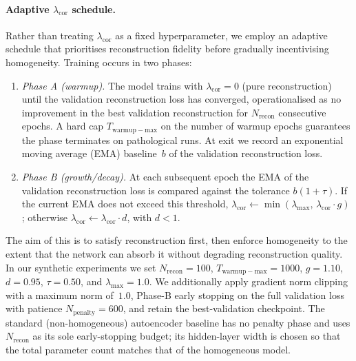 \paragraph{Adaptive $\lambda_{\mathrm{cor}}$ schedule.}
Rather than treating $\lambda_{\mathrm{cor}}$ as a fixed hyperparameter, we employ an adaptive schedule that prioritises reconstruction fidelity before gradually incentivising homogeneity.  Training occurs in two phases:
\begin{enumerate}
    \item \emph{Phase A (warmup).} The model trains with $\lambda_{\mathrm{cor}} = 0$ (pure reconstruction) until the validation reconstruction loss has converged, operationalised as no improvement in the best validation reconstruction for $N_{\mathrm{recon}}$ consecutive epochs.  A hard cap $T_{\mathrm{warmup-max}}$ on the number of warmup epochs guarantees the phase terminates on pathological runs.  At exit we record an exponential moving average (EMA) baseline~$b$ of the validation reconstruction loss.
    \item \emph{Phase B (growth/decay).} At each subsequent epoch the EMA of the validation reconstruction loss is compared against the tolerance $b(1 + \tau)$.  If the current EMA does not exceed this threshold, $\lambda_{\mathrm{cor}} \leftarrow \min(\lambda_{\max},\, \lambda_{\mathrm{cor}} \cdot g)$; otherwise $\lambda_{\mathrm{cor}} \leftarrow \lambda_{\mathrm{cor}} \cdot d$, with $d < 1$.
\end{enumerate}
The aim of this is to satisfy reconstruction first, then enforce homogeneity to the extent that the network can absorb it without degrading reconstruction quality.  In our synthetic experiments we set $N_{\mathrm{recon}} = 100$, $T_{\mathrm{warmup-max}} = 1000$, $g = 1.10$, $d = 0.95$, $\tau = 0.50$, and $\lambda_{\max} = 1.0$.  We additionally apply gradient norm clipping with a maximum norm of~$1.0$, Phase-B early stopping on the full validation loss with patience $N_{\mathrm{penalty}} = 600$, and retain the best-validation checkpoint.  The standard (non-homogeneous) autoencoder baseline has no penalty phase and uses $N_{\mathrm{recon}}$ as its sole early-stopping budget; its hidden-layer width is chosen so that the total parameter count matches that of the homogeneous model.

